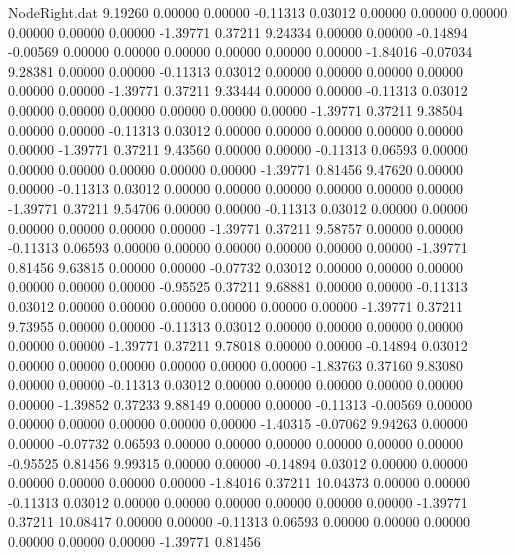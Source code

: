\begin{filecontents}{NodeRight.dat}
   9.19260    0.00000    0.00000    -0.11313    0.03012    0.00000    0.00000    0.00000    0.00000    0.00000    0.00000   -1.39771    0.37211
   9.24334    0.00000    0.00000    -0.14894   -0.00569    0.00000    0.00000    0.00000    0.00000    0.00000    0.00000   -1.84016   -0.07034
   9.28381    0.00000    0.00000    -0.11313    0.03012    0.00000    0.00000    0.00000    0.00000    0.00000    0.00000   -1.39771    0.37211
   9.33444    0.00000    0.00000    -0.11313    0.03012    0.00000    0.00000    0.00000    0.00000    0.00000    0.00000   -1.39771    0.37211
   9.38504    0.00000    0.00000    -0.11313    0.03012    0.00000    0.00000    0.00000    0.00000    0.00000    0.00000   -1.39771    0.37211
   9.43560    0.00000    0.00000    -0.11313    0.06593    0.00000    0.00000    0.00000    0.00000    0.00000    0.00000   -1.39771    0.81456
   9.47620    0.00000    0.00000    -0.11313    0.03012    0.00000    0.00000    0.00000    0.00000    0.00000    0.00000   -1.39771    0.37211
   9.54706    0.00000    0.00000    -0.11313    0.03012    0.00000    0.00000    0.00000    0.00000    0.00000    0.00000   -1.39771    0.37211
   9.58757    0.00000    0.00000    -0.11313    0.06593    0.00000    0.00000    0.00000    0.00000    0.00000    0.00000   -1.39771    0.81456
   9.63815    0.00000    0.00000    -0.07732    0.03012    0.00000    0.00000    0.00000    0.00000    0.00000    0.00000   -0.95525    0.37211
   9.68881    0.00000    0.00000    -0.11313    0.03012    0.00000    0.00000    0.00000    0.00000    0.00000    0.00000   -1.39771    0.37211
   9.73955    0.00000    0.00000    -0.11313    0.03012    0.00000    0.00000    0.00000    0.00000    0.00000    0.00000   -1.39771    0.37211
   9.78018    0.00000    0.00000    -0.14894    0.03012    0.00000    0.00000    0.00000    0.00000    0.00000    0.00000   -1.83763    0.37160
   9.83080    0.00000    0.00000    -0.11313    0.03012    0.00000    0.00000    0.00000    0.00000    0.00000    0.00000   -1.39852    0.37233
   9.88149    0.00000    0.00000    -0.11313   -0.00569    0.00000    0.00000    0.00000    0.00000    0.00000    0.00000   -1.40315   -0.07062
   9.94263    0.00000    0.00000    -0.07732    0.06593    0.00000    0.00000    0.00000    0.00000    0.00000    0.00000   -0.95525    0.81456
   9.99315    0.00000    0.00000    -0.14894    0.03012    0.00000    0.00000    0.00000    0.00000    0.00000    0.00000   -1.84016    0.37211
  10.04373    0.00000    0.00000    -0.11313    0.03012    0.00000    0.00000    0.00000    0.00000    0.00000    0.00000   -1.39771    0.37211
  10.08417    0.00000    0.00000    -0.11313    0.06593    0.00000    0.00000    0.00000    0.00000    0.00000    0.00000   -1.39771    0.81456

\end{filecontents}
